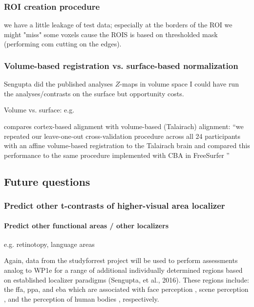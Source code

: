 \subsubsection{ROI creation procedure}

we have a little leakage of test data; especially at the borders of the ROI we
might "miss" some voxels cause the ROIS is based on thresholded mask (performing
com cutting on the edges).



\subsubsection{Volume-based registration vs. surface-based normalization}

%
Sengupta did the published analyses $Z$-maps in volume space
%
I could have run the analyses/contrasts on the surface but opportunity costs.
%

Volume vs. surface: e.g. \citep{desai2005volumetric}

\citep{weiner2018defining} compares cortex-based alignment
\citep{fischl1999high} with volume-based (Talairach) alignment: ``we repeated
our leave-one-out cross-validation procedure across all 24 participants with an
affine volume-based registration to the Talairach brain and compared this
performance to the same procedure implemented with CBA in FreeSurfer
\citep{weiner2018defining}''




\subsection{Future questions}

\subsubsection{Predict other t-contrasts of higher-visual area localizer}


\paragraph{Predict other functional areas / other localizers}


e.g. retinotopy, language areas

%
Again, data from the studyforrest project will be used to perform assessments
analog to WP1e for a range of additional individually determined regions based
on established localizer paradigms (Sengupta, et al., 2016).
%
These regions include: the \ac{ffa}, \ac{ppa}, and \ac{eba}  which are
associated with face perception \citep{kanwisher1997ffa,
pitcher2011occipitalfacearea}, scene perception \citep{epstein1998ppa}, and the
perception of human bodies \citep{downing2001bodyarea}, respectively.

